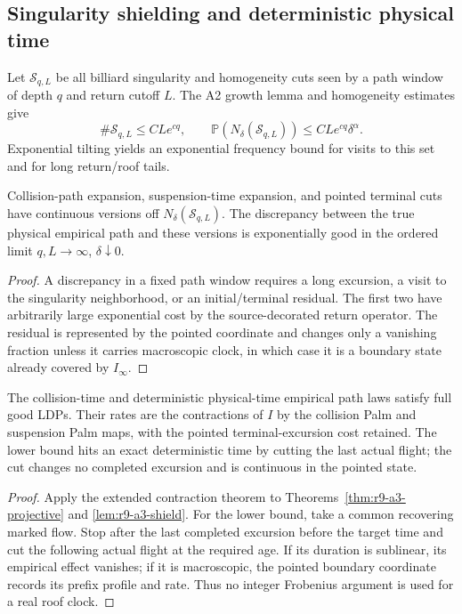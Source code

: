 \subsection{Singularity shielding and deterministic physical time}

Let $\mathscr S_{q,L}$ be all billiard singularity and homogeneity cuts seen by
a path window of depth $q$ and return cutoff $L$.  The A2 growth lemma and
homogeneity estimates give
\[
 \#\mathscr S_{q,L}\le CLe^{cq},
 \qquad
 \mathbb P(N_\delta(\mathscr S_{q,L}))
 \le CLe^{cq}\delta^\alpha.
\]
Exponential tilting yields an exponential frequency bound for visits to this
set and for long return/roof tails.

\begin{lemma}
\label{lem:r9-a3-shield}
Collision-path expansion, suspension-time expansion, and pointed terminal cuts
have continuous versions off $N_\delta(\mathscr S_{q,L})$.  The discrepancy
between the true physical empirical path and these versions is exponentially
good in the ordered limit $q,L\to\infty$, $\delta\downarrow0$.
\end{lemma}

\begin{proof}
A discrepancy in a fixed path window requires a long excursion, a visit to the
singularity neighborhood, or an initial/terminal residual.  The first two have
arbitrarily large exponential cost by the source-decorated return operator.
The residual is represented by the pointed coordinate and changes only a
vanishing fraction unless it carries macroscopic clock, in which case it is a
boundary state already covered by $I_\infty$.
\end{proof}

\begin{theorem}
\label{thm:r9-a3-physical}
The collision-time and deterministic physical-time empirical path laws satisfy
full good LDPs.  Their rates are the contractions of $I$ by the collision Palm
and suspension Palm maps, with the pointed terminal-excursion cost retained.
The lower bound hits an exact deterministic time by cutting the last actual
flight; the cut changes no completed excursion and is continuous in the
pointed state.
\end{theorem}

\begin{proof}
Apply the extended contraction theorem to
Theorems~\ref{thm:r9-a3-projective} and
\ref{lem:r9-a3-shield}.  For the lower bound, take a common recovering marked
flow.  Stop after the last completed excursion before the target time and cut
the following actual flight at the required age.  If its duration is
sublinear, its empirical effect vanishes; if it is macroscopic, the pointed
boundary coordinate records its prefix profile and rate.  Thus no integer
Frobenius argument is used for a real roof clock.
\end{proof}
